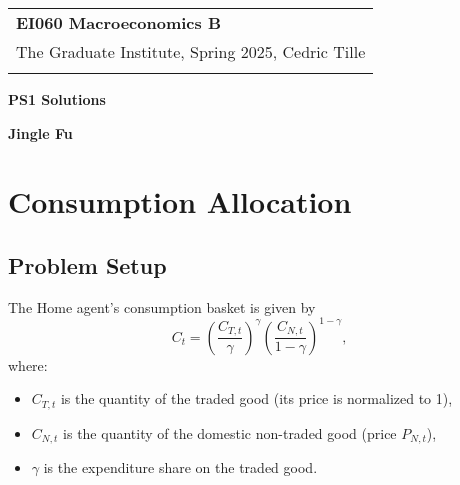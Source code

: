 \documentclass[a4paper,12pt]{article} %
\theoremstyle{nonitalic}
\begin{document}
\thispagestyle{empty} %

\begin{tabular}{p{15.5cm}} %
{\large \bf EI060 Macroeconomics B} \\
The Graduate Institute, Spring 2025, Cedric Tille\\
\hline %
\\
\end{tabular} %

\vspace*{0.3cm} %

\begin{center} %
	{\Large \bf PS1 Solutions} %
	\vspace{2mm}
	
	{\bf Jingle Fu} %
		
\end{center}  

\vspace{0.4cm}

\section{Consumption Allocation}

\subsection*{Problem Setup}
The Home agent's consumption basket is given by
\[
C_t = \left(\frac{C_{T,t}}{\gamma } \right)^{\gamma} \left(\frac{C_{N,t}}{1 - \gamma} \right)^{ 1-\gamma},
\]
where:
\begin{itemize}
    \item $C_{T,t}$ is the quantity of the traded good (its price is normalized to 1),
    \item $C_{N,t}$ is the quantity of the domestic non-traded good (price $P_{N,t}$),
    \item $\gamma$ is the expenditure share on the traded good.
\end{itemize}
\end{document}

